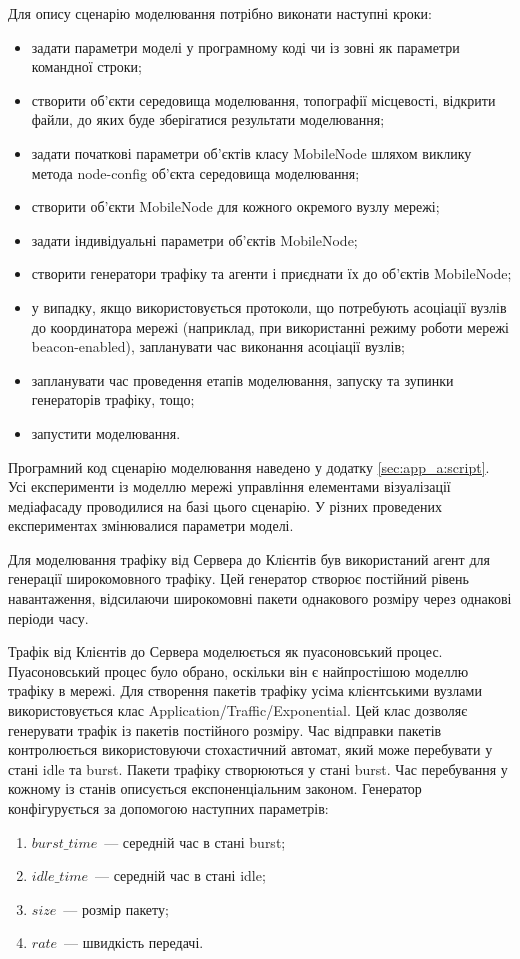 \documentclass[a4paper,ukrainian,utf8,nocolumnsxix,floatsection,equationsection]{eskdtext}
\newcommand{\bem}[0]{beacon-enabled\xspace}
\begin{document}
Для опису сценарію моделювання потрібно виконати наступні кроки:
\begin{itemize}
	\item задати параметри моделі у програмному коді чи із зовні як параметри командної строки;
	\item створити об'єкти середовища моделювання, топографії місцевості, відкрити файли, до яких буде зберігатися результати  моделювання;
	\item задати початкові параметри об'єктів класу MobileNode шляхом виклику метода node-config об'єкта середовища моделювання;
	\item створити об'єкти MobileNode для кожного окремого вузлу мережі;
	\item задати індивідуальні параметри об'єктів MobileNode;
	\item створити генератори трафіку та агенти і приєднати їх до об'єктів MobileNode;
	\item у випадку, якщо використовується протоколи, що потребують асоціації вузлів до координатора мережі (наприклад, при використанні режиму роботи мережі \bem), запланувати час виконання асоціації вузлів;
	\item запланувати час проведення етапів моделювання, запуску та зупинки генераторів трафіку, тощо;
	\item запустити моделювання.
\end{itemize}

Програмний код сценарію моделювання наведено у додатку \ref{sec:app_a:script}. Усі експерименти із моделлю мережі управління елементами візуалізації медіафасаду проводилися на базі цього сценарію. У різних проведених експериментах змінювалися параметри моделі.

Для моделювання трафіку від Сервера до Клієнтів був використаний агент для генерації широкомовного трафіку. Цей генератор створює постійний рівень навантаження, відсилаючи широкомовні пакети однакового розміру через однакові періоди часу.

Трафік від Клієнтів до Сервера моделюється як пуасоновський процес. Пуасоновський процес було обрано, оскільки він є найпростішою моделлю трафіку в мережі. Для створення пакетів трафіку усіма клієнтськими вузлами використовується клас Application/Traffic/Exponential. Цей клас дозволяє генерувати трафік із пакетів постійного розміру. Час відправки пакетів контролюється використовуючи стохастичний автомат, який може перебувати у стані idle та burst. Пакети трафіку створюються у стані burst. Час перебування у кожному із станів описується експоненціальним законом. Генератор конфігурується за допомогою наступних параметрів: 
\begin{enumerate}
	\item $burst\_time$~--- середній час в стані burst;
	\item $idle\_time$~--- середній час в стані idle;
	\item $size$~--- розмір пакету;
	\item $rate$~--- швидкість передачі.
\end{enumerate}
\end{document}
